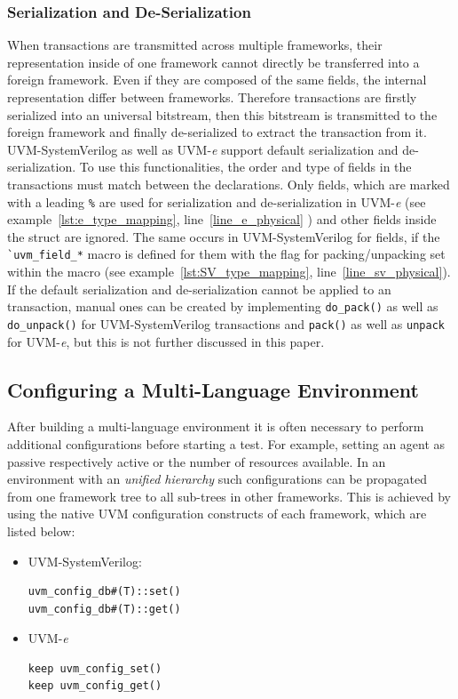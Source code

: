 \subsubsection{Serialization and De-Serialization}
When transactions are transmitted across multiple frameworks, their representation inside of one framework cannot
directly be transferred into a foreign framework. Even if they are composed of the same fields, the internal
representation differ between frameworks. Therefore transactions are firstly serialized into an universal bitstream,
then this bitstream is transmitted to the foreign framework and finally de-serialized to extract the transaction from
it.\\
UVM-SystemVerilog as well as UVM-\textit{e} support default serialization and de-serialization. To use this
functionalities,  the order and type of fields in the transactions must match between the declarations. Only fields,
which are marked with a leading \lstinline$%$ are used for serialization and de-serialization in UVM-\textit{e} (see
example~\ref{lst:e_type_mapping}, line~\ref{line_e_physical} ) and other fields inside the struct are ignored. The same
occurs in UVM-SystemVerilog for fields, if the \lstinline$`uvm_field_*$ macro is defined for them with the flag for
packing/unpacking set within the macro (see example~\ref{lst:SV_type_mapping}, line~\ref{line_sv_physical}).\\
If the default serialization and de-serialization cannot be applied to an transaction, manual ones can be created by
implementing \lstinline$do_pack()$ as well as \lstinline$do_unpack()$ for UVM-SystemVerilog transactions and
\lstinline$pack()$ as well as \lstinline$unpack$ for UVM-\textit{e}, but this is not further discussed in this paper. 
\subsection{Configuring a Multi-Language Environment} \label{ml_config}

After building a multi-language environment it is often necessary to perform additional configurations before starting a
test. For example, setting an agent as passive respectively active or the number of resources available. In an
environment with an \emph{unified hierarchy} such configurations can be propagated from one framework tree
to all sub-trees in other frameworks. This is achieved by using the native UVM configuration constructs of each
framework, which are listed below:
\begin{itemize}
\item{UVM-SystemVerilog:}
{}
\begin{lstlisting}
uvm_config_db#(T)::set()
uvm_config_db#(T)::get()
\end{lstlisting} 

\item{UVM-\textit{e}}
{}
\begin{lstlisting}
keep uvm_config_set()
keep uvm_config_get()
\end{lstlisting} 
\end{itemize}

